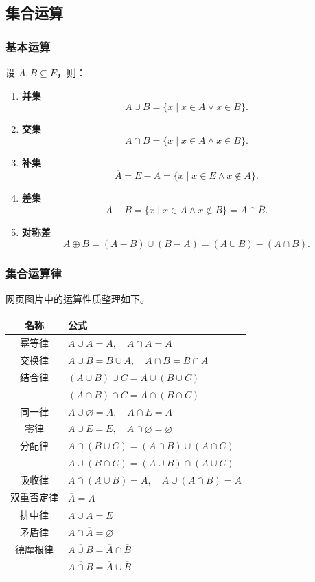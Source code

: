 \subsection{集合运算}

\subsubsection{基本运算}

设 \(A,B\subseteq E\)，则：
\begin{enumerate}
	\item \textbf{并集}
	\[
	A\cup B=\{x\mid x\in A\lor x\in B\}.
	\]
	\item \textbf{交集}
	\[
	A\cap B=\{x\mid x\in A\land x\in B\}.
	\]
	\item \textbf{补集}
	\[
	\overline{A}=E-A=\{x\mid x\in E\land x\notin A\}.
	\]
	\item \textbf{差集}
	\[
	A-B=\{x\mid x\in A\land x\notin B\}=A\cap\overline{B}.
	\]
	\item \textbf{对称差}
	\[
	A\oplus B=(A-B)\cup(B-A)=(A\cup B)-(A\cap B).
	\]
\end{enumerate}

\subsubsection{集合运算律}

网页图片中的运算性质整理如下。

\begin{center}
	\begin{tabular}{cl}
		\toprule
		名称 & 公式\\
		\midrule
		幂等律 & \(A\cup A=A,\quad A\cap A=A\)\\
		交换律 & \(A\cup B=B\cup A,\quad A\cap B=B\cap A\)\\
		结合律 & \((A\cup B)\cup C=A\cup(B\cup C)\)\\
		       & \((A\cap B)\cap C=A\cap(B\cap C)\)\\
		同一律 & \(A\cup\varnothing=A,\quad A\cap E=A\)\\
		零律 & \(A\cup E=E,\quad A\cap\varnothing=\varnothing\)\\
		分配律 & \(A\cap(B\cup C)=(A\cap B)\cup(A\cap C)\)\\
		       & \(A\cup(B\cap C)=(A\cup B)\cap(A\cup C)\)\\
		吸收律 & \(A\cap(A\cup B)=A,\quad A\cup(A\cap B)=A\)\\
		双重否定律 & \(\overline{\overline{A}}=A\)\\
		排中律 & \(A\cup\overline{A}=E\)\\
		矛盾律 & \(A\cap\overline{A}=\varnothing\)\\
		德摩根律 & \(\overline{A\cup B}=\overline{A}\cap\overline{B}\)\\
		          & \(\overline{A\cap B}=\overline{A}\cup\overline{B}\)\\
		\bottomrule
	\end{tabular}
\end{center}

